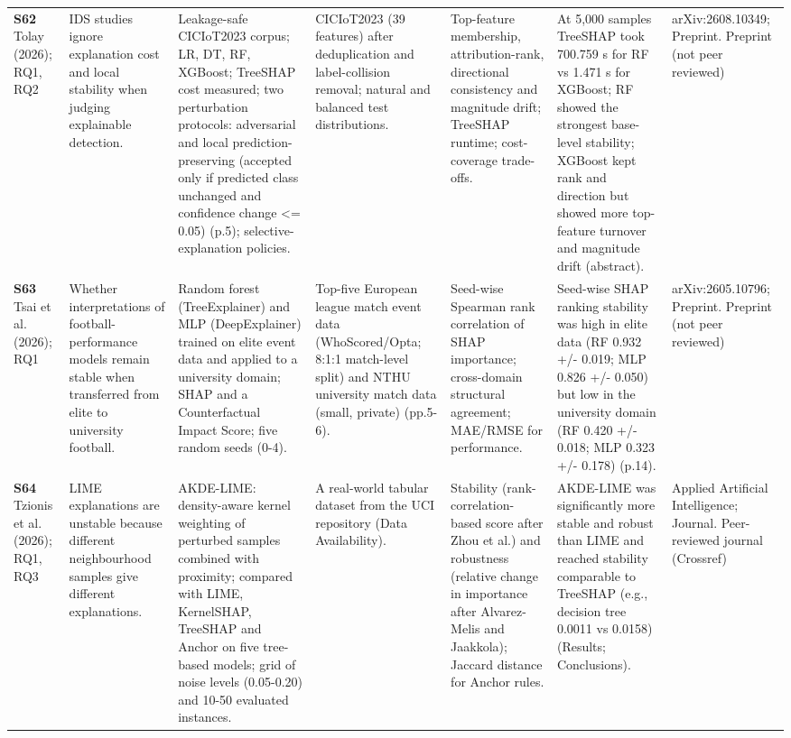 \begin{longtable}{@{}P{1.55cm}P{2.9cm}P{4.5cm}P{3.2cm}P{3.4cm}P{4.6cm}P{3.6cm}@{}}
\textbf{S62} \cite{S62} Tolay (2026); RQ1, RQ2 & IDS studies ignore explanation cost and local stability when judging explainable detection. & Leakage-safe CICIoT2023 corpus; LR, DT, RF, XGBoost; TreeSHAP cost measured; two perturbation protocols: adversarial and local prediction-preserving (accepted only if predicted class unchanged and confidence change \textless{}= 0.05) (p.5); selective-explanation policies. & CICIoT2023 (39 features) after deduplication and label-collision removal; natural and balanced test distributions. & Top-feature membership, attribution-rank, directional consistency and magnitude drift; TreeSHAP runtime; cost-coverage trade-offs. & At 5,000 samples TreeSHAP took 700.759 s for RF vs 1.471 s for XGBoost; RF showed the strongest base-level stability; XGBoost kept rank and direction but showed more top-feature turnover and magnitude drift (abstract). & arXiv:2608.10349; Preprint. Preprint (not peer reviewed) \\
\textbf{S63} \cite{S63} Tsai et al. (2026); RQ1 & Whether interpretations of football-performance models remain stable when transferred from elite to university football. & Random forest (TreeExplainer) and MLP (DeepExplainer) trained on elite event data and applied to a university domain; SHAP and a Counterfactual Impact Score; five random seeds (0-4). & Top-five European league match event data (WhoScored/\allowbreak{}Opta; 8:1:1 match-level split) and NTHU university match data (small, private) (pp.5-6). & Seed-wise Spearman rank correlation of SHAP importance; cross-domain structural agreement; MAE/\allowbreak{}RMSE for performance. & Seed-wise SHAP ranking stability was high in elite data (RF 0.932 +/\allowbreak{}- 0.019; MLP 0.826 +/\allowbreak{}- 0.050) but low in the university domain (RF 0.420 +/\allowbreak{}- 0.018; MLP 0.323 +/\allowbreak{}- 0.178) (p.14). & arXiv:2605.10796; Preprint. Preprint (not peer reviewed) \\
\textbf{S64} \cite{S64} Tzionis et al. (2026); RQ1, RQ3 & LIME explanations are unstable because different neighbourhood samples give different explanations. & AKDE-LIME: density-aware kernel weighting of perturbed samples combined with proximity; compared with LIME, KernelSHAP, TreeSHAP and Anchor on five tree-based models; grid of noise levels (0.05-0.20) and 10-50 evaluated instances. & A real-world tabular dataset from the UCI repository (Data Availability). & Stability (rank-correlation-based score after Zhou et al.) and robustness (relative change in importance after Alvarez-Melis and Jaakkola); Jaccard distance for Anchor rules. & AKDE-LIME was significantly more stable and robust than LIME and reached stability comparable to TreeSHAP (e.g., decision tree 0.0011 vs 0.0158) (Results; Conclusions). & Applied Artificial Intelligence; Journal. Peer-reviewed journal (Crossref) \\

\end{longtable}
